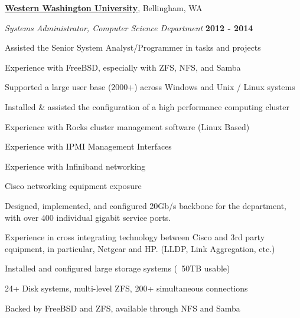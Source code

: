\documentclass[10pt]{article}
\newcommand{\halfblankline}{\quad\vspace{-0.5\baselineskip}\pagebreak[3]}
\begin{document}
\href{http://www.wwu.edu/}{\textbf{Western Washington University}}, Bellingham, WA
\begin{outerlist}
  \item[] \textit{Systems Administrator, Computer Science Department}
  \hfill \textbf{2012 - 2014}
  \begin{innerlist}
    \item Assisted the Senior System Analyst/Programmer in tasks and projects
    \item Experience with FreeBSD, especially with ZFS, NFS, and Samba
    \item Supported a large user base (2000+) across Windows and Unix / Linux systems
    \item Installed \& assisted the configuration of a high performance computing cluster
    \begin{innerlist}
      \item Experience with Rocks cluster management software (Linux Based)
      \item Experience with IPMI Management Interfaces
      \item Experience with Infiniband networking
    \end{innerlist}
    \item Cisco networking equipment exposure
    \begin{innerlist}
      \item Designed, implemented, and configured 20Gb/s backbone for the 
            department, \\with over 400 individual gigabit service ports.
      \item Experience in cross integrating technology between Cisco and 3rd party
            equipment, in particular, Netgear and HP. (LLDP, Link Aggregation, etc.)
    \end{innerlist}
    \item Installed and configured large storage systems (~50TB usable)
    \begin{innerlist}
      \item 24+ Disk systems, multi-level ZFS, 200+ simultaneous connections
      \item Backed by FreeBSD and ZFS, available through NFS and Samba
    \end{innerlist}
  \end{innerlist}
\end{outerlist}

\halfblankline
\end{document}
